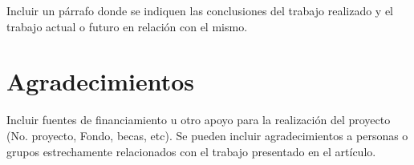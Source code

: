 \documentclass[sigconf]{acmart}
\begin{document}
Incluir un párrafo donde se indiquen las conclusiones del trabajo realizado y el trabajo actual o futuro en relación con el mismo.


\section*{Agradecimientos}
Incluir fuentes de financiamiento u otro apoyo para la realización del proyecto (No. proyecto, Fondo, becas, etc). Se pueden incluir agradecimientos a personas o grupos estrechamente relacionados con el trabajo presentado en el artículo.





\end{document}
